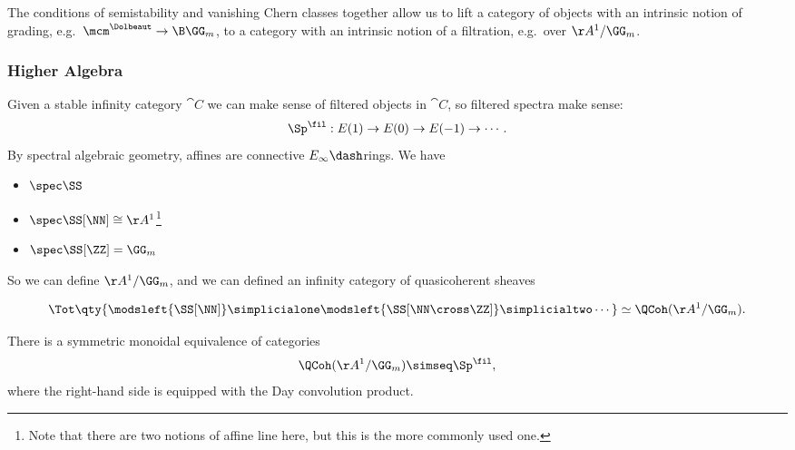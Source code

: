 \begin{remark}

The conditions of semistability and vanishing Chern classes together
allow us to lift a category of objects with an intrinsic notion of
grading, e.g.~\(\mcm^\Dolbeaut \to \B \GG_m\), to a category with an
intrinsic notion of a filtration, e.g.~over \(\AA^1/\GG_m\).

\end{remark}

\hypertarget{higher-algebra}{%
\subsubsection{Higher Algebra}\label{higher-algebra}}

\begin{remark}

Given a stable infinity category \(\cat{C}\) we can make sense of
filtered objects in \(\cat{C}\), so filtered spectra make sense:
\begin{align*}
\Sp^{\fil}: E(1) \to E(0) \to E(-1) \to \cdots
.\end{align*}
By spectral algebraic geometry, affines are connective
\(E_\infty\dash\)rings. We have

\begin{itemize}
\tightlist
\item
  \(\spec \SS\)
\item
  \(\spec \SS[\NN] \cong \AA^1\)\footnote{Note that there are two
    notions of affine line here, but this is the more commonly used one.}
\item
  \(\spec \SS[\ZZ] = \GG_m\)
\end{itemize}

So we can define \(\AA^1/\GG_m\), and we can defined an infinity
category of quasicoherent sheaves

\begin{align*}
\Tot\qty{ \modsleft{\SS[\NN]} \simplicialone \modsleft{\SS[\NN \cross \ZZ]} \simplicialtwo \cdots } 
\simeq \QCoh(\AA^1/\GG_m)
.\end{align*}

\end{remark}

\begin{theorem}[?]

There is a symmetric monoidal equivalence of categories
\begin{align*}
\QCoh(\AA^1/\GG_m) \simseq \Sp^{\fil}
,\end{align*}
where the right-hand side is equipped with the Day convolution product.

\end{theorem}

